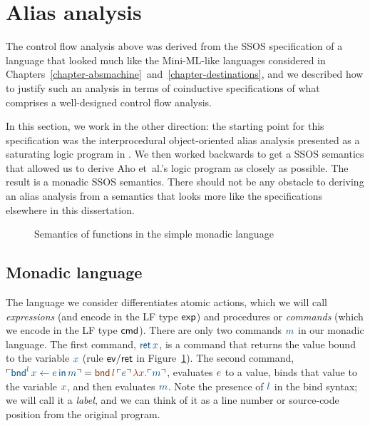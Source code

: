 \section{Alias analysis}
\label{sec:aliasanalysis}

The control flow analysis above was derived from the SSOS
specification of a language that looked much like the Mini-ML-like
languages considered in
Chapters~\ref{chapter-absmachine}~and~\ref{chapter-destinations}, and
we described how to justify such an analysis in terms of coinductive
specifications of what comprises a well-designed control flow
analysis.

In this section, we work in the other direction: the starting point
for this specification was the interprocedural object-oriented alias
analysis presented as a saturating logic program in \cite[Chapter
12.4]{aho07compilers}. We then worked backwards to get a SSOS
semantics that allowed us to derive Aho et~al.'s logic program as closely as
possible. The result is a monadic SSOS semantics. There should
not be any obstacle to deriving an alias analysis from a
semantics that looks more like the specifications elsewhere in this
dissertation.

\begin{figure}
\caption{Semantics of functions in the simple monadic language}
\label{fig:ssos-monadic}
\end{figure}

\subsection{Monadic language}

The language we consider differentiates atomic actions, which we will
call {\it expressions} (and encode in the LF type ${\sf exp}$) and
procedures or {\it commands} (which we encode in the LF type ${\sf
  cmd}$). There are only two commands $\obj{m}$ in our monadic language. The
first command, $\obj{{\sf ret}\,x}$, is a command that returns the value
bound to the variable $\obj{x}$ (rule ${\sf ev/ret}$ in
Figure~\ref{fig:ssos-monadic}). The second command, $\interp{{\sf
    bnd}^l\, x \leftarrow e \,{\sf in}\,m} = \lf{{\sf
  bnd}\,l\,\interp{e}\,\lambda x.\interp{m}}$, evaluates $\obj{e}$ to a
value, binds that value to the variable $\obj{x}$, and then evaluates
$\obj{m}$. Note the presence of $\obj{l}$ 
in the bind syntax; we will call it a
{\it label}, and we can think of it as a line number or source-code
position from the original program.

